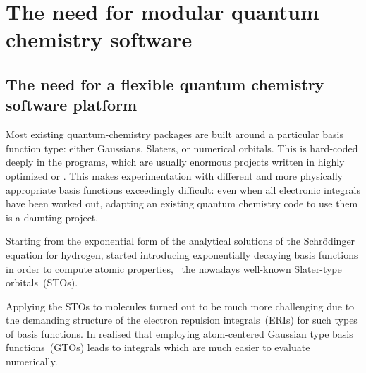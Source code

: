 \section{The need for modular quantum chemistry software}

\subsection{The need for a flexible quantum chemistry software platform}

%
%


Most existing quantum-chemistry packages
are built around a 
particular basis function type: either Gaussians,
Slaters, or numerical orbitals. This is hard-coded 
deeply in the programs, which are usually enormous
projects written in  highly optimized \cpp or \fortran.
This makes experimentation with different and more physically
appropriate basis functions exceedingly difficult:
even when all electronic integrals have been worked out,
adapting an existing quantum chemistry code to use
them is a daunting project.



Starting from the exponential form of the analytical solutions of the
Schrödinger equation for hydrogen,
\citeauthor{Slater1930} started introducing exponentially decaying basis functions
in order to compute atomic properties,~\cite{Slater1930}
the nowadays well-known Slater-type orbitals~(STOs).

Applying the STOs to molecules turned out to be much more
challenging due to the demanding structure of the electron repulsion integrals~(ERIs)
for such types of basis functions.
In \citeyear{Boys1950} \citeauthor{Boys1950} realised that employing
atom-centered Gaussian type basis functions~(GTOs) leads to integrals
which are much easier to evaluate numerically.

